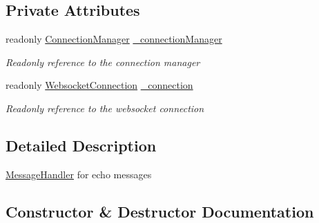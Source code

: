 \subsection*{Private Attributes}
\begin{DoxyCompactItemize}
\item 
readonly \hyperlink{class_web_analyzer_1_1_server_1_1_connection_manager}{Connection\+Manager} \hyperlink{class_web_analyzer_1_1_server_1_1_message_handler_1_1_echo_message_handler_a936f408ce4e67d13029830db8a3cd398}{\+\_\+connection\+Manager}
\begin{DoxyCompactList}\small\item\em Readonly reference to the connection manager \end{DoxyCompactList}\item 
readonly \hyperlink{class_web_analyzer_1_1_server_1_1_websocket_connection}{Websocket\+Connection} \hyperlink{class_web_analyzer_1_1_server_1_1_message_handler_1_1_echo_message_handler_a2a7b752d022345cb8b575f4a84435e1e}{\+\_\+connection}
\begin{DoxyCompactList}\small\item\em Readonly reference to the websocket connection \end{DoxyCompactList}\end{DoxyCompactItemize}


\subsection{Detailed Description}
\hyperlink{namespace_web_analyzer_1_1_server_1_1_message_handler}{Message\+Handler} for echo messages 



\subsection{Constructor \& Destructor Documentation}
\hypertarget{class_web_analyzer_1_1_server_1_1_message_handler_1_1_echo_message_handler_a24fde9b6bc5b7849cada3d74e378ce5c}{}
